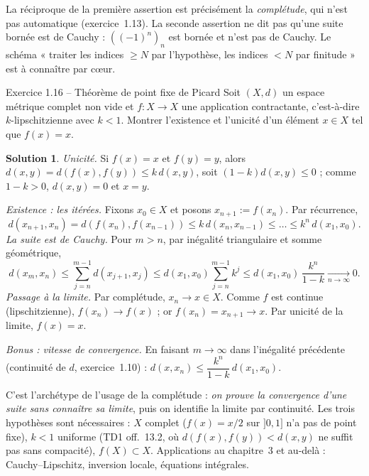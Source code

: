 \documentclass[11pt,a4paper]{article}
\newcommand{\ie}{c'est-à-dire}
\theoremstyle{definition}
\newtheorem*{solution}{Solution}
\begin{document}
\begin{piege}
La réciproque de la première assertion est précisément la \emph{complétude}, qui n'est pas automatique (exercice~1.13). La seconde assertion ne dit pas qu'une suite bornée est de Cauchy : $((-1)^n)_n$ est bornée et n'est pas de Cauchy. Le schéma « traiter les indices $\ge N$ par l'hypothèse, les indices $<N$ par finitude » est à connaître par cœur.
\end{piege}

\begin{exo}{Exercice 1.16 -- Théorème de point fixe de Picard}
Soit $(X,d)$ un espace métrique complet non vide et $f:X\to X$ une application contractante, \ie{} $k$-lipschitzienne avec $k<1$. Montrer l'existence et l'unicité d'un élément $x\in X$ tel que $f(x)=x$.
\end{exo}

\begin{solution}
\emph{Unicité.} Si $f(x)=x$ et $f(y)=y$, alors $d(x,y)=d(f(x),f(y))\le k\,d(x,y)$, soit $(1-k)d(x,y)\le0$ ; comme $1-k>0$, $d(x,y)=0$ et $x=y$.

\emph{Existence : les itérées.} Fixons $x_0\in X$ et posons $x_{n+1}:=f(x_n)$. Par récurrence,
\[
d(x_{n+1},x_n)=d(f(x_n),f(x_{n-1}))\le k\,d(x_n,x_{n-1})\le\dots\le k^n\,d(x_1,x_0).
\]
\emph{La suite est de Cauchy.} Pour $m>n$, par inégalité triangulaire et somme géométrique,
\[
d(x_m,x_n)\le\sum_{j=n}^{m-1}d(x_{j+1},x_j)\le d(x_1,x_0)\sum_{j=n}^{m-1}k^j\le d(x_1,x_0)\,\frac{k^n}{1-k}\xrightarrow[n\to\infty]{}0 .
\]
\emph{Passage à la limite.} Par complétude, $x_n\to x\in X$. Comme $f$ est continue (lipschitzienne), $f(x_n)\to f(x)$ ; or $f(x_n)=x_{n+1}\to x$. Par unicité de la limite, $f(x)=x$.

\emph{Bonus : vitesse de convergence.} En faisant $m\to\infty$ dans l'inégalité précédente (continuité de $d$, exercice~1.10) : $d(x,x_n)\le\dfrac{k^n}{1-k}\,d(x_1,x_0)$.
\end{solution}

\begin{pointcle}
C'est l'archétype de l'usage de la complétude : \emph{on prouve la convergence d'une suite sans connaître sa limite}, puis on identifie la limite par continuité. Les trois hypothèses sont nécessaires : $X$ complet ($f(x)=x/2$ sur $]0,1]$ n'a pas de point fixe), $k<1$ uniforme (TD1 off.~13.2, où $d(f(x),f(y))<d(x,y)$ ne suffit pas sans compacité), $f(X)\subset X$. Applications au chapitre~3 et au-delà : Cauchy--Lipschitz, inversion locale, équations intégrales.
\end{pointcle}
\end{document}
